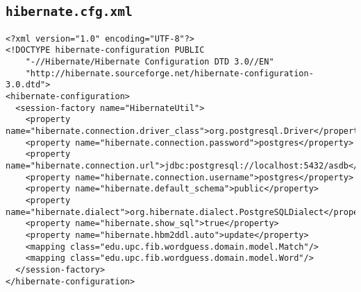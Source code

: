 \subsection{\texttt{hibernate.cfg.xml}}
\begin{verbatim}
<?xml version="1.0" encoding="UTF-8"?>
<!DOCTYPE hibernate-configuration PUBLIC 
    "-//Hibernate/Hibernate Configuration DTD 3.0//EN"
    "http://hibernate.sourceforge.net/hibernate-configuration-3.0.dtd">
<hibernate-configuration>
  <session-factory name="HibernateUtil">
    <property name="hibernate.connection.driver_class">org.postgresql.Driver</property>
    <property name="hibernate.connection.password">postgres</property>
    <property name="hibernate.connection.url">jdbc:postgresql://localhost:5432/asdb</property>
    <property name="hibernate.connection.username">postgres</property>
    <property name="hibernate.default_schema">public</property>
    <property name="hibernate.dialect">org.hibernate.dialect.PostgreSQLDialect</property>
    <property name="hibernate.show_sql">true</property>
    <property name="hibernate.hbm2ddl.auto">update</property>
    <mapping class="edu.upc.fib.wordguess.domain.model.Match"/>
    <mapping class="edu.upc.fib.wordguess.domain.model.Word"/>
  </session-factory>
</hibernate-configuration>
\end{verbatim}


